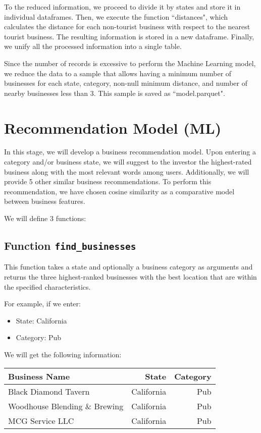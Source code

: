 \documentclass[12pt]{article}
\begin{document}
To the reduced information, we proceed to divide it by states and store it in individual dataframes. Then, we execute the function ``distances", which calculates the distance for each non-tourist business with respect to the nearest tourist business. The resulting information is stored in a new dataframe. Finally, we unify all the processed information into a single table.

Since the number of records is excessive to perform the Machine Learning model, we reduce the data to a sample that allows having a minimum number of businesses for each state, category, non-null minimum distance, and number of nearby businesses less than 3. This sample is saved as ``model.parquet".

\section{Recommendation Model (ML)}

In this stage, we will develop a business recommendation model. Upon entering a category and/or business state, we will suggest to the investor the highest-rated business along with the most relevant words among users. Additionally, we will provide 5 other similar business recommendations. To perform this recommendation, we have chosen cosine similarity as a comparative model between business features.

We will define 3 functions:

\subsection{Function \texttt{find\_businesses}}

This function takes a state and optionally a business category as arguments and returns the three highest-ranked businesses with the best location that are within the specified characteristics.

For example, if we enter:
\begin{itemize}
    \item State: California
    \item Category: Pub
\end{itemize}

We will get the following information:

\begin{tabular}{|l|r|r|}
\hline
Business Name & State & Category \\
\hline
Black Diamond Tavern & California & Pub \\
Woodhouse Blending \& Brewing & California & Pub \\
MCG Service LLC & California & Pub \\
\hline
\end{tabular}
\end{document}
